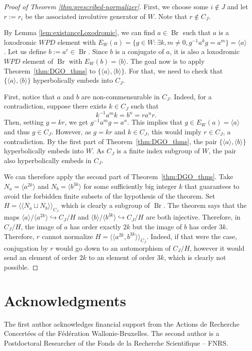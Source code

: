 \documentclass[11pt,letterpaper]{amsart}
\newcommand{\Br}{\operatorname{Br}}
\begin{document}
\begin{proof}[Proof of Theorem \ref{thm:prescribed-normalizer}]
First, we choose some $i \notin J$ and let $r := r_i$ be the associated involutive generator of $W$. Note that $r \notin C_J$. 

By Lemma \ref{lem:existanceLoxodromic}, we can find $a\in \Br$ such that $a$ is a loxodromic $WPD$ element with $E_W(a) = \{g \in W : \exists k,m \neq 0 , g^{-1} a^k g = a^m \} = \langle a \rangle $. Let us define $b := a^r \in \Br$. Since $b$ is a conjugate of $a$, it is also a loxodromic $WPD$ element of $\Br$ with $E_W(b) = \langle b \rangle$. The goal now is to apply Theorem~\ref{thm:DGO_thms} to $\{\langle a\rangle, \langle b\rangle\}$. For that, we need to check that $\{\langle a\rangle, \langle b\rangle\}$ hyperbolically embeds into $C_J$.

First, notice that $a$ and $b$ are non-commensurable in $C_J$. Indeed, for a contradiction, suppose there exists $k \in C_J$ such that 
$$
k^{-1}a^m k = b^n =ra^nr.
$$
Then, setting $g = kr$, we get $g^{-1} a^m g  = a^n$. This implies that $g \in E_W(a) = \langle a \rangle$ and thus $g \in C_J$. However, as $g = kr$ and $k \in C_J$, this would imply $r \in C_J$, a contradiction. 
By the first part of Theorem~\ref{thm:DGO_thms}, the pair $\{\langle a \rangle, \langle b \rangle \}$ hyperbolically embeds into $W$. As $C_J$ is a finite index subgroup of $W$, the pair also hyperbolically embeds in $C_J$.

We can therefore apply the second part of Theorem~\ref{thm:DGO_thms}. Take $N_a = \langle a^{2k} \rangle$ and $N_b = \langle b^{3k} \rangle$ for some sufficiently big integer $k$ that guarantees to avoid the forbidden finite subsets of the hypothesis of the theorem.
Set $H = \langle\langle N_a \sqcup N_b\rangle \rangle_{C_J}$ which is clearly a subgroup of $\Br$. The theorem says that the maps $\langle a \rangle/ \langle a^{2k} \rangle \hookrightarrow C_J / H$ and $\langle b \rangle/ \langle b^{3k} \rangle \hookrightarrow C_J / H$ are both injective. Therefore, in $C_J / H$, the image of $a$ has order exactly $2k$ but the image of $b$ has order $3k$. Therefore, $r$ cannot normalize $H = \langle\langle a^{2k},b^{3k}\rangle\rangle_{C_J}$. Indeed, if that were the case, conjugation by $r$ would go down to an automorphism of $C_J / H$, however it would send an element of order $2k$ to an element of order $3k$, which is clearly not possible.
\end{proof}


\section*{Acknowledgments}
The first author acknowledges financial support from the Actions de Recherche Concertées of the Fédération Wallonie-Bruxelles. The second author is a Postdoctoral Researcher of the Fonds de la Recherche Scientifique -- FNRS.
\end{document}
